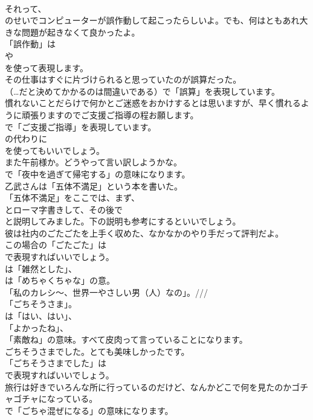 \documentclass[8pt]{extreport}
\begin{document}
\begin{CJK}{UTF8}{min}
\\	それって、
\\	のせいでコンピューターが誤作動して起こったらしいよ。でも、何はともあれ大きな問題が起きなくて良かったよ。 
\\	「誤作動」は
\\	や
\\	を使って表現します。	
\\	その仕事はすぐに片づけられると思っていたのが誤算だった。 
\\	（…だと決めてかかるのは間違いである）で「誤算」を表現しています。	
\\	慣れないことだらけで何かとご迷惑をおかけするとは思いますが、早く慣れるように頑張りますのでご支援ご指導の程お願します。 
\\	で「ご支援ご指導」を表現しています。
\\	の代わりに 
\\	を使ってもいいでしょう。	
\\	また午前様か。どうやって言い訳しようかな。 
\\	で「夜中を過ぎて帰宅する」の意味になります。	
\\	乙武さんは「五体不満足」という本を書いた。 
\\	「五体不満足」をここでは、まず、
\\	とローマ字書きして、その後で
\\	と説明してみました。下の説明も参考にするといいでしょう。	
\\	彼は社内のごたごたを上手く収めた、なかなかのやり手だって評判だよ。 
\\	この場合の「ごたごた」は 
\\	で表現すればいいでしょう。
\\	は「雑然とした」、
\\	は「めちゃくちゃな」の意。	
\\	「私のカレシ～、世界一やさしい男（人）なの」。///
\\	「ごちそうさま」。 
\\	は「はい、はい」、
\\	「よかったね」、
\\	「素敵ね」の意味。すべて皮肉って言っていることになります。	
\\	ごちそうさまでした。とても美味しかったです。 
\\	「ごちそうさまでした」は
\\	で表現すればいいでしょう。	
\\	旅行は好きでいろんな所に行っているのだけど、なんかどこで何を見たのかゴチャゴチャになっている。 
\\	で「ごちゃ混ぜになる」の意味になります。

\end{CJK}
\end{document}
